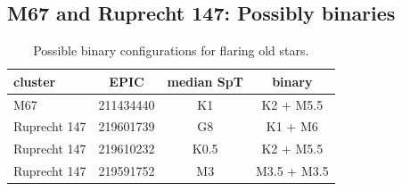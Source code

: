 \documentclass{aa}
\begin{document}
\subsection{M67 and Ruprecht 147: Possibly binaries}
\begin{table}

\caption{Possible binary configurations for flaring old stars.}
\label{tab:m67_rup147_binaries}
\centering
\begin{tabular}{lccc}
\hline\hline
 cluster & EPIC & median SpT &     binary \\
\hline
     M67 &  211434440 &         K1 &    K2 + M5.5 \\
 Ruprecht 147 &  219601739 &         G8 &      K1 + M6 \\
 Ruprecht 147 &  219610232 &       K0.5 &    K2 + M5.5 \\
 Ruprecht 147 &  219591752 &         M3 &  M3.5 + M3.5 \\
\hline
\end{tabular}
\end{table}
\end{document}
